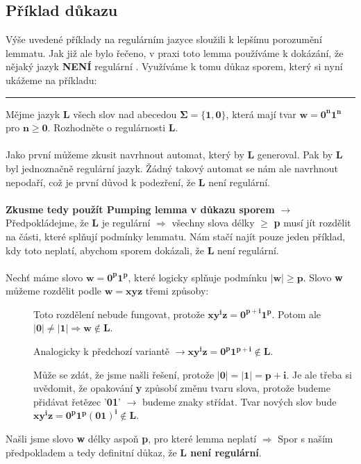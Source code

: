 \documentclass{report}
\begin{document}
     \subsection*{Příklad důkazu}
     Výše uvedené příklady na regulárním jazyce sloužili k lepšímu porozumění lemmatu. Jak již ale bylo řečeno, v praxi toto lemma používáme k dokázání, že nějaký jazyk \textbf{NENÍ} regulární . Využíváme k tomu důkaz sporem, který si nyní ukážeme na příkladu:
     \hrule
     \vspace{0.5cm}
     Mějme jazyk \textbf{L} všech slov nad abecedou $\mathbf{\Sigma=\{1,0\}}$, která mají tvar $\mathbf{w = 0^n1^n}$ pro $\mathbf{n \ge 0}$. Rozhodněte o regulárnosti \textbf{L}.\\ \\
     Jako první můžeme zkusit navrhnout automat, který by \textbf{L} generoval. Pak by \textbf{L} byl jednoznačně regulární jazyk. Žádný takový automat se nám ale navrhnout nepodaří, což je první důvod k podezření, že \textbf{L} není regulární.\\ \\
     \textbf{Zkusme tedy použít Pumping lemma v důkazu sporem} $\rightarrow$ Předpokládejme, že \textbf{L} je regulární $\Rightarrow$ všechny slova délky $\ge$ \textbf{p} musí jít rozdělit na části, které splňují podmínky lemmatu. Nám stačí najít pouze jeden příklad, kdy toto neplatí, abychom sporem dokázali, že \textbf{L} není regulární.\\ \\ 
     Nechť máme slovo $\mathbf{w = 0^p1^p}$, které logicky splňuje podmínku $\mathbf{{\mid}w{\mid}\ge p}$. Slovo \textbf{w} můžeme rozdělit podle $\mathbf{w=xyz}$ třemi způsoby:
     \begin{description}
         \item[] Toto rozdělení nebude fungovat, protože $\mathbf{xy^iz = 0^{p+i}1^p}$. Potom ale $\mathbf{{\mid}0{\mid}\neq{\mid}1{\mid} \Rightarrow w \notin L}$. 
         \item[] Analogicky k předchozí variantě $\mathbf{\rightarrow xy^iz = 0^p1^{p+i} \notin L}$. 
         \item[] Může se zdát, že jsme našli řešení, protože $\mathbf{{\mid}0{\mid}={\mid}1{\mid = p+i}}$. Je ale třeba si uvědomit, že opakování \textbf{y} způsobí změnu tvaru slova, protože budeme přidávat řetězec '\textbf{01}' $\rightarrow$ budeme znaky střídat. Tvar nových slov bude $\mathbf{xy^iz = 0^p1^p(01)^i \notin L}$.
     \end{description}
     Našli jsme slovo \textbf{w} délky aspoň \textbf{p}, pro které lemma neplatí $\Rightarrow$ Spor s naším předpokladem a tedy definitní důkaz, že \textbf{L není regulární}.
\setcounter{chapter}{4}
\setcounter{section}{0}
\end{document}
